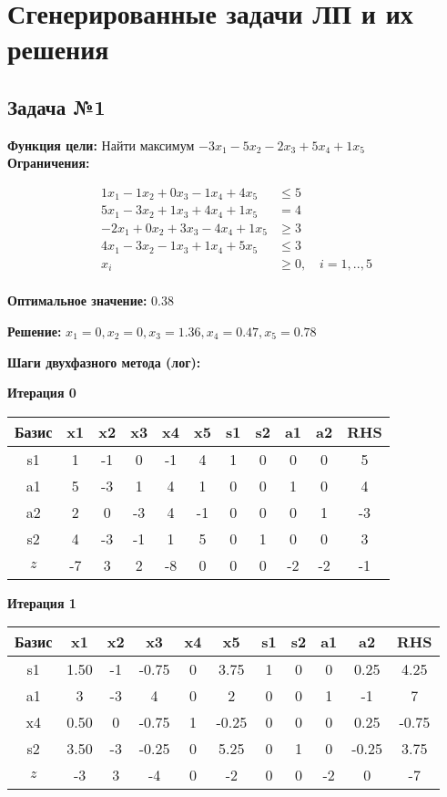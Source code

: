 \documentclass[a4paper,12pt]{article}
\begin{document}
\section*{Сгенерированные задачи ЛП и их решения}

\subsection*{Задача №1}
\textbf{Функция цели: }
Найти максимум $ -3x_{1} -5x_{2} -2x_{3} +5x_{4} +1x_{5} $\\

\textbf{Ограничения:}

\[ \begin{aligned}
1x_{1} -1x_{2} +0x_{3} -1x_{4} +4x_{5} &\le 5 \\
5x_{1} -3x_{2} +1x_{3} +4x_{4} +1x_{5} &= 4 \\
-2x_{1} +0x_{2} +3x_{3} -4x_{4} +1x_{5} &\ge 3 \\
4x_{1} -3x_{2} -1x_{3} +1x_{4} +5x_{5} &\le 3 \\
x_i &\ge 0,\quad i=1,..,5\\
\end{aligned}\]

\textbf{Оптимальное значение: }$0.38$

\textbf{Решение: }$x_{1}=0, x_{2}=0, x_{3}=1.36, x_{4}=0.47, x_{5}=0.78$

\textbf{Шаги двухфазного метода (лог):}


 \textbf{Итерация 0}\\
\begin{tabular}{|c|c|c|c|c|c|c|c|c|c|c|}
\hline
Базис & x1 & x2 & x3 & x4 & x5 & s1 & s2 & a1 & a2 & RHS \\ \hline
s1 & 1 & -1 & 0 & -1 & 4 & 1 & 0 & 0 & 0 & 5 \\ \hline
a1 & 5 & -3 & 1 & 4 & 1 & 0 & 0 & 1 & 0 & 4 \\ \hline
a2 & 2 & 0 & -3 & 4 & -1 & 0 & 0 & 0 & 1 & -3 \\ \hline
s2 & 4 & -3 & -1 & 1 & 5 & 0 & 1 & 0 & 0 & 3 \\ \hline
$z$ & -7 & 3 & 2 & -8 & 0 & 0 & 0 & -2 & -2 & -1 \\ \hline
\end{tabular}
\vspace{5mm}

 \textbf{Итерация 1}\\
\begin{tabular}{|c|c|c|c|c|c|c|c|c|c|c|}
\hline
Базис & x1 & x2 & x3 & x4 & x5 & s1 & s2 & a1 & a2 & RHS \\ \hline
s1 & 1.50 & -1 & -0.75 & 0 & 3.75 & 1 & 0 & 0 & 0.25 & 4.25 \\ \hline
a1 & 3 & -3 & 4 & 0 & 2 & 0 & 0 & 1 & -1 & 7 \\ \hline
x4 & 0.50 & 0 & -0.75 & 1 & -0.25 & 0 & 0 & 0 & 0.25 & -0.75 \\ \hline
s2 & 3.50 & -3 & -0.25 & 0 & 5.25 & 0 & 1 & 0 & -0.25 & 3.75 \\ \hline
$z$ & -3 & 3 & -4 & 0 & -2 & 0 & 0 & -2 & 0 & -7 \\ \hline
\end{tabular}
\vspace{5mm}
\end{document}
